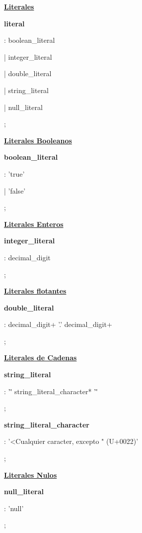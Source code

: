 		\underline{\textbf{Literales}}\par
		\textbf{literal}\par
		: boolean\_literal\par
		| integer\_literal\par
		| double\_literal\par
		| string\_literal\par
		| null\_literal\par
		;\par
		
		\underline{\textbf{Literales Booleanos}}\par
		\textbf{boolean\_literal}\par
		: 'true'\par
		| 'false'\par
		;\par
		
		\underline{\textbf{Literales Enteros}}\par
		\textbf{integer\_literal}\par
		: decimal\_digit\par
		;\par
		
		\underline{\textbf{Literales flotantes}}\par
		\textbf{double\_literal}\par
		: decimal\_digit+ '.' decimal\_digit+\par
		;\par
		
		\underline{\textbf{Literales de Cadenas}}\par
		\textbf{string\_literal}\par
		: '\"' string\_literal\_character* '\"'\par
		;\par
		
		\textbf{string\_literal\_character}\par
		: '<Cualquier caracter, excepto " (U+0022)'\par
		;\par
		
		\underline{\textbf{Literales Nulos}}\par
		\textbf{null\_literal}\par
		: 'null'\par
		;\par
		

